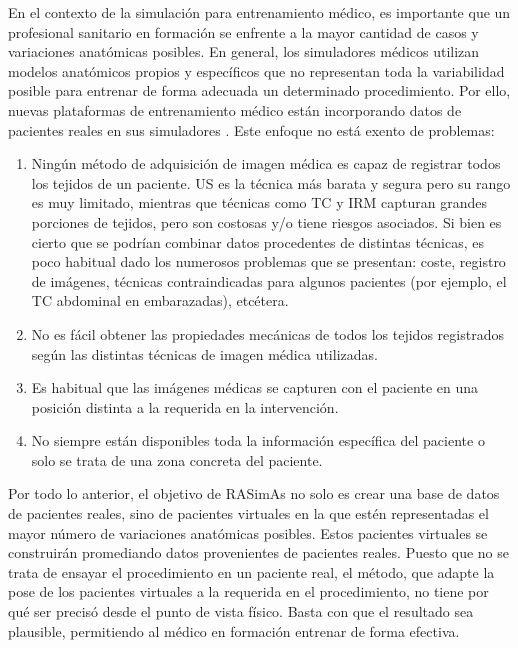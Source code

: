 En el contexto de la simulación para entrenamiento médico, es importante que un profesional sanitario en formación se enfrente a la mayor cantidad de casos y  variaciones anatómicas posibles. En general, los simuladores médicos utilizan modelos anatómicos propios y específicos que no representan toda la variabilidad posible para entrenar de forma adecuada un determinado procedimiento. 
Por ello, nuevas plataformas de entrenamiento médico están incorporando datos de pacientes reales en sus simuladores \cite{Willaert2012,Votta2013}. Este enfoque no está exento de problemas:
\begin{enumerate}
    \item Ningún método de adquisición de imagen médica es capaz de registrar todos los tejidos de un paciente.
    \ac{US} es la técnica más barata y segura pero su rango es muy limitado, mientras que técnicas como \ac{TC} y \ac{IRM} capturan grandes porciones de tejidos, pero son costosas y/o tiene riesgos asociados. 
    Si bien es cierto que se podrían combinar datos procedentes de distintas técnicas, es poco habitual dado  los numerosos problemas que se presentan: coste, registro de imágenes, técnicas contraindicadas para algunos pacientes (por ejemplo, el \ac{TC} abdominal en embarazadas), etcétera.
    \item No es fácil obtener las propiedades mecánicas  de todos los tejidos registrados según las distintas técnicas de imagen médica utilizadas.
    \item Es habitual que las imágenes médicas se capturen con el paciente en una posición distinta a la requerida en la intervención.
    \item No siempre están disponibles toda la información específica del paciente o solo se trata de una zona concreta del paciente.
\end{enumerate}
%
Por todo lo anterior, el objetivo de \ac{RASimAs} no solo es crear una base de datos de pacientes reales, sino de pacientes virtuales en la que estén representadas el mayor número de variaciones anatómicas posibles. Estos pacientes virtuales se construirán promediando datos provenientes de pacientes reales. Puesto que no se trata de ensayar el procedimiento en un paciente real, el método, que adapte la pose de los pacientes virtuales a la requerida en el procedimiento, no tiene por qué ser precisó desde el punto de vista físico. Basta con que el resultado sea plausible, permitiendo al médico en formación entrenar de forma efectiva.
